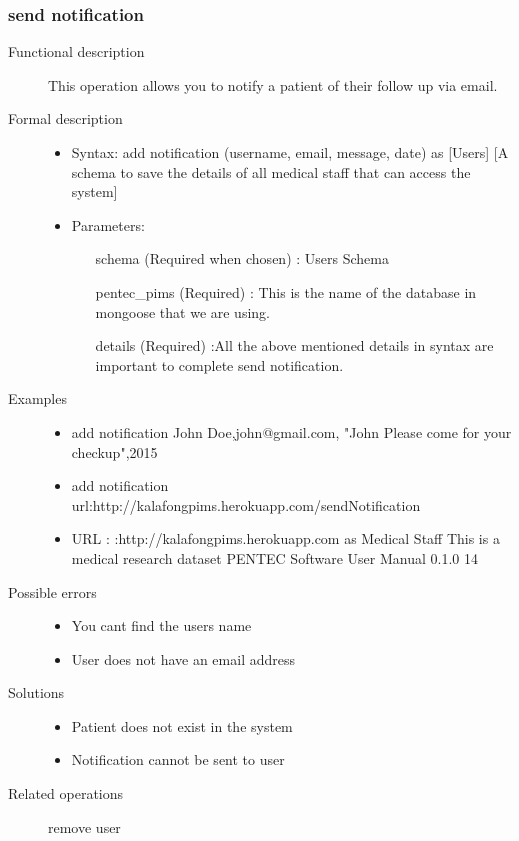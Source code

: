 \documentclass[14pt, a4paper]{article}
\begin{document}
\subsubsection{send notification}
\begin{description}
\item[Functional description] This operation allows you to notify a patient of their follow up via email.
\item[Formal description]\hfill
\begin{itemize}
	\item Syntax: add notification (username, email, message, date) as [Users] [A schema to save the details of all medical staff that can access the system]\\
	\item Parameters:
	\begin{itemize}
		\item [schema] (Required when chosen) : Users Schema
		\item [pentec\_pims] (Required) : This is the name of the database in mongoose that we are using.
		\item [details] (Required) :All the above mentioned details in syntax are important to complete send notification.
	\end{itemize}
\end{itemize}
\item[Examples]\hfill
\begin{itemize}
	\item add notification John Doe,john@gmail.com, "John Please come for your checkup",2015
	\item add notification url:http://kalafongpims.herokuapp.com/sendNotification
	\item URL : :http://kalafongpims.herokuapp.com as Medical Staff This is a medical research dataset
	PENTEC Software User Manual 0.1.0 14
\end{itemize}

\item[Possible errors]\hfill
\begin{itemize}
	\item You cant find the users name
	\item User does not have an email address
\end{itemize}


\item[Solutions]\hfill
\begin{itemize}
	\item Patient does not exist in the system
	\item Notification cannot be sent to user
\end{itemize}


\item[Related operations] remove user
\end{description}
	   
\end{document}
